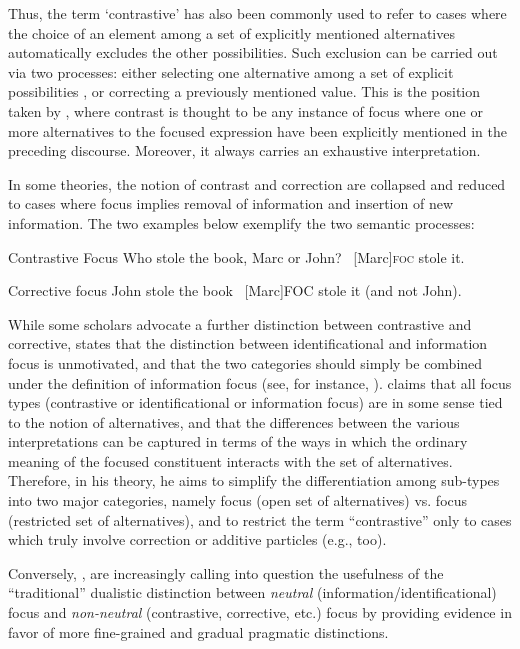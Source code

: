 Thus, the term `contrastive' has also been commonly used to refer to cases where the choice of an element among a set of explicitly mentioned alternatives automatically excludes the other possibilities. Such exclusion can be carried out via two processes: either selecting one alternative among a set of explicit possibilities \parencite{dik1981typology}, or correcting a previously mentioned value. This is the position taken by \textcite{chafe1976givenness}, where contrast is thought to be any instance of focus where one or more alternatives to the focused expression have been explicitly mentioned in the preceding discourse. Moreover, it always carries an exhaustive interpretation. 

In some theories, the notion of contrast and correction are collapsed and reduced to cases where focus implies removal of information and insertion of new information. The two examples below exemplify the two semantic processes:

\ea \label{ex21}  {Contrastive Focus}
\ea Who stole the book, Marc or John?
\ex \ [Marc]\textsc{foc} \normalsize stole it.
\z \z 

\ea \label{ex22}  {Corrective focus}
\ea John stole the book
\ex  \ [Marc]\tiny FOC \normalsize{stole it (and not John)}.
\z \z

While some scholars advocate a further distinction between contrastive and corrective, \textcite{krifka2008basic} states that the distinction between identificational and information focus is unmotivated, and that the two categories should simply be combined under the definition of information focus (see, for instance, \cite{vallduvi1992informational}).
\textcite{krifka2008basic} claims that all focus types (contrastive or identificational or information focus) are in some sense tied to the notion of alternatives, and that the differences between the various interpretations can be captured in terms of the ways in which the ordinary meaning of the focused constituent interacts with the set of alternatives. Therefore, in his theory, he aims to simplify the differentiation among sub-types into  two major categories, namely  focus (open set of alternatives) vs.  focus (restricted set of alternatives), and to restrict the term ``contrastive” only to cases which truly involve correction or additive particles (e.g., too).

Conversely, \textcite{torregrossa2012towards}, \textcite{cruschina2012discourse, cruschina2021,cruschina_mayol_2024_syntax_mapping, cruschina_mayol_2025_gradience_optionality} are increasingly calling into question the usefulness of the ``traditional” dualistic distinction between \textit{neutral} (information/identificational) focus and \textit{non-neutral} (contrastive, corrective, etc.) focus by providing evidence in favor of more fine-grained and gradual pragmatic distinctions.

